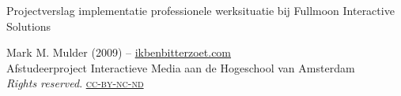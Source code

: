 \thispagestyle{empty}

\begin{flushleft}

  \Huge
  Projectverslag implementatie professionele werksituatie bij Fullmoon Interactive Solutions\\

  \vfill{}

  \small
  Mark M. Mulder (2009) -- \href{http://www.ikbenbitterzoet.com/}{ikbenbitterzoet.com}\\
  Afstudeerproject Interactieve Media aan de Hogeschool van Amsterdam
  \\\emph{Rights reserved}.  \href{http://creativecommons.org/licenses/by-nc-nd/3.0/nl/}{\textsc{cc-by-nc-nd}}

\end{flushleft}
\pagebreak
\normalsize
